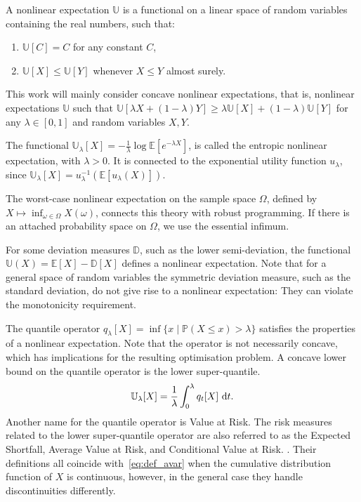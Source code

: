 \documentclass[main.tex]{subfiles}
\begin{document}
\begin{mydef}
  A nonlinear expectation $\mathbb{U}$ is a functional on a linear space of random
  variables containing the real numbers, such that:
  \begin{enumerate}
  \item $\mathbb{U}[C] = C$ for any constant $C$,
  \item $\mathbb{U}[X]\leq \mathbb{U}[Y]$ whenever $X\leq Y$ almost surely.
  \end{enumerate}
  This work will mainly consider concave nonlinear expectations, that
  is, nonlinear expectations $\mathbb{U}$ such that
  $\mathbb{U}[\lambda X + (1-\lambda)Y]\geq \lambda\mathbb{U}[X] +
  (1-\lambda) \mathbb{U}[Y]$ for any $\lambda\in[0,1]$ and random
  variables $X,Y$.
\end{mydef}

\begin{example}
  The functional $\mathbb{U}_\lambda[X]=-\frac{1}{\lambda}\log\mathbb
  E[e^{-\lambda X}]$, is called the entropic nonlinear expectation,
  with $\lambda>0$.
  It is connected to the exponential utility function $u_\lambda$, since
  $\mathbb{U}_\lambda[X]= u_\lambda^{-1}(\mathbb{E}[u_\lambda(X)])$.

  The worst-case nonlinear expectation on the sample space $\Omega$,
  defined by
  $X\mapsto  \inf_{\omega\in\Omega}X(\omega)$, connects this theory with robust
  programming. If there is an attached probability space on $\Omega$,
  we use the essential infimum.

  For some deviation measures $\mathbb{D}$, such as the lower
  semi-deviation, the functional $\mathbb{U}(X)=\mathbb{E}[X]-\mathbb
  D[X]$ defines a nonlinear expectation. Note that for a general space
  of random variables the symmetric deviation measure, such as the
  standard deviation, do not give rise to a nonlinear
  expectation: They can violate the monotonicity requirement.

  The quantile operator
  $q_\lambda[X] = \inf\{x\mid\mathbb{P}(X\leq x)>
  \lambda\}$ satisfies the properties of a nonlinear expectation.
  Note that the operator is not necessarily concave, which has
  implications for the resulting optimisation problem.
  A concave lower bound on the quantile operator is
  the lower super-quantile.
  \begin{equation}\label{eq:def_avar}
    \mathbb{U}_\lambda[X]=\frac{1}{\lambda}\int_0^\lambda q_t[X]\,\,\mathrm{d}t.
  \end{equation}
  Another name for the quantile operator is Value at Risk.
  The risk measures related to the lower super-quantile operator are also referred to as
  the Expected Shortfall, Average Value at Risk, and Conditional Value at Risk.
  \citep{artzner1999coherent,rockafellar2002conditional,follmer2004stochastic}.
  Their definitions all coincide with~\eqref{eq:def_avar} when the
  cumulative distribution function of $X$ is continuous, however, in
  the general case they handle discontinuities differently.
\end{example}
\end{document}
